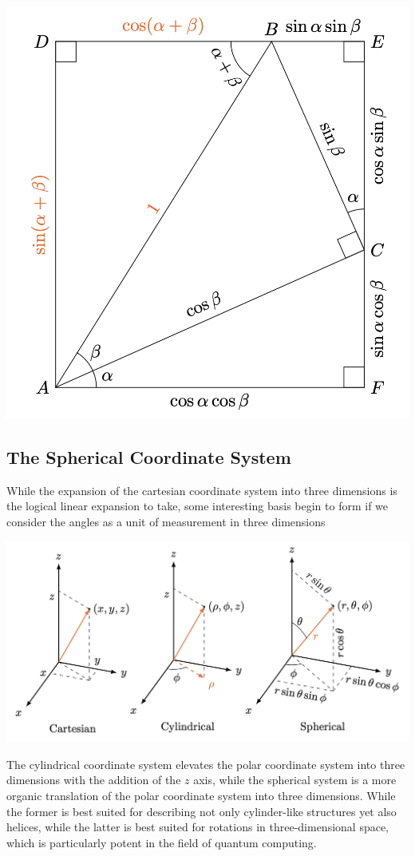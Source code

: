 \documentclass[12pt]{article}
\theoremstyle{definition}
\begin{document}
\includegraphics[width=\textwidth]{2_trig7.png}

\subsection{The Spherical Coordinate System}

While the expansion of the cartesian coordinate system into three dimensions is the logical linear expansion to take, some interesting basis begin to form if we consider the angles as a unit of measurement in three dimensions

\includegraphics[width=\textwidth]{2_trig8.png}

The cylindrical coordinate system elevates the polar coordinate system into three dimensions with the addition of the $z$ axis, while the spherical system is a more organic translation of the polar coordinate system into three dimensions. While the former is best suited for describing not only cylinder-like structures yet also helices, while the latter is best suited for rotations in three-dimensional space, which is particularly potent in the field of quantum computing. 
\end{document}
